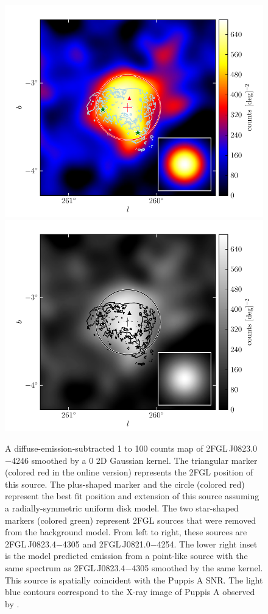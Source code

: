 \begin{figure}[htbp]
    \ifcolorfigure
      \includegraphics{source_plots/source_Puppis_A_color.pdf}
    \else
      \includegraphics{source_plots/source_Puppis_A_bw.pdf}
    \fi
  \caption{A diffuse-emission-subtracted 1 \gev to 100 \gev counts map
  of 2FGL\,J0823.0$-$4246 smoothed by a 0 2D
  Gaussian kernel.  The triangular marker 
  (colored red in the online version)
  represents the 2FGL position of this source.  The plus-shaped
  marker and the circle (colored
  red) represent 
  the best fit position and extension of this source assuming a
  radially-symmetric uniform disk model.  The two 
  star-shaped markers (colored
  green) represent 2FGL sources that were
  removed from the background model.
  From left to right, these sources are 2FGL\,J0823.4$-$4305 and 2FGL\,J0821.0$-$4254.
  The lower right inset is the model predicted emission from a point-like
  source with the same spectrum as 2FGL\,J0823.4$-$4305 smoothed by the
  same kernel.  This source is spatially coincident with the Puppis A
  SNR. The light blue contours correspond to the X-ray image of Puppis
  A observed by \rosat \citep{petre_1996a_central-stellar}.
  }
\end{figure}



